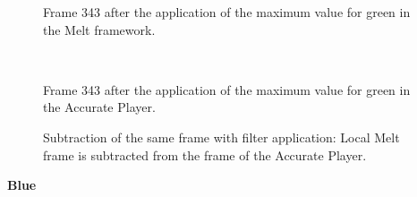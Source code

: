 \documentclass[../MasterThesis.tex]{subfiles}
\begin{document}
\begin{minipage}{0.48\textwidth}
	
	\begin{figure}[H]
		\begin{center}
			\caption[Frame 343 after the application of the green filter in the Melt framework.]{Frame 343 after the application of the maximum value for green in the Melt framework.}
		\end{center}
	\end{figure}
\end{minipage}\begin{minipage}{0.04\textwidth}
	\ 
\end{minipage}\begin{minipage}{0.48\textwidth}
	
	\begin{figure}[H]
		\begin{center}
			\caption[Frame 343 after the application of the green filter in the Accurate Player.]{Frame 343 after the application of the maximum value for green in the Accurate Player.}
		\end{center}
	\end{figure}
\end{minipage}

\vspace*{-1em}

\begin{figure}[H]
	\begin{center}
		\caption[Subtraction of the two different frames (Accurate Player - Melt).]{Subtraction of the same frame with filter application: Local Melt frame is subtracted from the frame of the Accurate Player.}
	\end{center}
\end{figure}









\textbf{Blue}

\vspace*{-1em}
\end{document}
